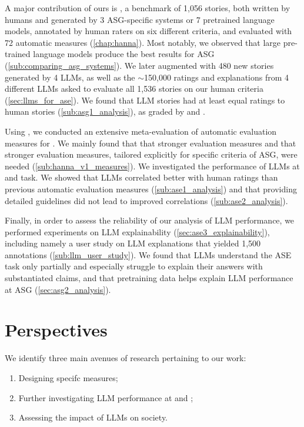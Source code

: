 A major contribution of ours is {\hanna}, a benchmark of 1,056 stories, both written by humans and generated by 3 ASG-specific systems or 7 pretrained language models, annotated by human raters on six different criteria, and evaluated with 72 automatic measures (\autoref{chap:hanna}). Most notably, we observed that large pre-trained language models produce the best results for ASG (\autoref{sub:comparing_asg_systems}). We later augmented {\hanna} with 480 new stories generated by 4 LLMs, as well as the $\sim$150,000 ratings and explanations from 4 different LLMs asked to evaluate all 1,536 {\hanna} stories on our human criteria (\autoref{sec:llms_for_ase}). We found that LLM stories had at least equal ratings to human stories (\autoref{sub:asg1_analysis}), as graded by {\beluga} and {\mistral}.

Using {\hanna}, we conducted an extensive meta-evaluation of automatic evaluation measures for {\asgfull}. We mainly found that that stronger evaluation measures and that stronger evaluation measures, tailored explicitly for specific criteria of ASG, were needed (\autoref{sub:hanna_v1_measures}). We investigated the performance of LLMs at {\ase} and {\asg} task. We showed that LLMs correlated better with human ratings than previous automatic evaluation measures (\autoref{sub:ase1_analysis}) and that providing detailed guidelines did not lead to improved correlations (\autoref{sub:ase2_analysis}).

Finally, in order to assess the reliability of our analysis of LLM performance, we performed experiments on LLM explainability (\autoref{sec:ase3_explainability}), including namely a user study on LLM explanations that yielded 1,500 annotations (\autoref{sub:llm_user_study}). We found that LLMs understand the ASE task only partially and especially struggle to explain their answers with substantiated claims, and that pretraining data helps explain LLM performance at ASG (\autoref{sec:asg2_analysis}).

\section{Perspectives}
\label{sec:ccl_perspectives}

We identify three main avenues of research pertaining to our work:
\begin{enumerate}[noitemsep]
    \item Designing specifc {\asefull} measures;
    \item Further investigating LLM performance at {\asg} and {\ase};
    \item Assessing the impact of LLMs on society.
\end{enumerate}

